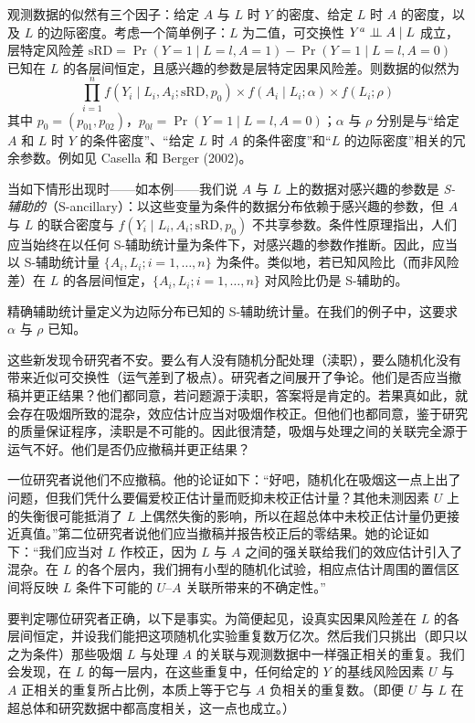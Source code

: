 \begin{techpoint}[条件性原理的形式陈述]
观测数据的似然有三个因子：给定 $A$ 与 $L$ 时 $Y$ 的密度、给定 $L$ 时 $A$ 的密度，以及 $L$ 的边际密度。考虑一个简单例子：$L$ 为二值，可交换性 $Y^a\perp\!\!\!\perp A\mid L$ 成立，层特定风险差 $\mathrm{sRD}=\Pr(Y=1\mid L=l,A=1)-\Pr(Y=1\mid L=l,A=0)$ 已知在 $L$ 的各层间恒定，且感兴趣的参数是层特定因果风险差。则数据的似然为
\[
\prod_{i=1}^{n} f(Y_i\mid L_i,A_i;\mathrm{sRD},p_0)\times f(A_i\mid L_i;\alpha)\times f(L_i;\rho)
\]
其中 $p_0=(p_{01},p_{02})$，$p_{0l}=\Pr(Y=1\mid L=l,A=0)$；$\alpha$ 与 $\rho$ 分别是与“给定 $A$ 和 $L$ 时 $Y$ 的条件密度”、“给定 $L$ 时 $A$ 的条件密度”和“$L$ 的边际密度”相关的冗余参数。例如见 Casella 和 Berger (2002)。

当如下情形出现时——如本例——我们说 $A$ 与 $L$ 上的数据对感兴趣的参数是 \emph{S-辅助的}（S-ancillary）：以这些变量为条件的数据分布依赖于感兴趣的参数，但 $A$ 与 $L$ 的联合密度与 $f(Y_i\mid L_i,A_i;\mathrm{sRD},p_0)$ 不共享参数。条件性原理指出，人们应当始终在以任何 S-辅助统计量为条件下，对感兴趣的参数作推断。因此，应当以 S-辅助统计量 $\{A_i,L_i;i=1,\dots,n\}$ 为条件。类似地，若已知风险比（而非风险差）在 $L$ 的各层间恒定，$\{A_i,L_i;i=1,\dots,n\}$ 对风险比仍是 S-辅助的。

精确辅助统计量定义为边际分布已知的 S-辅助统计量。在我们的例子中，这要求 $\alpha$ 与 $\rho$ 已知。
\end{techpoint}

这些新发现令研究者不安。要么有人没有随机分配处理（渎职），要么随机化没有带来近似可交换性（运气差到了极点）。研究者之间展开了争论。他们是否应当撤稿并更正结果？他们都同意，若问题源于渎职，答案将是肯定的。若果真如此，就会存在吸烟所致的混杂，效应估计应当对吸烟作校正。但他们也都同意，鉴于研究的质量保证程序，渎职是不可能的。因此很清楚，吸烟与处理之间的关联完全源于运气不好。他们是否仍应撤稿并更正结果？

一位研究者说他们不应撤稿。他的论证如下：“好吧，随机化在吸烟这一点上出了问题，但我们凭什么要偏爱校正估计量而贬抑未校正估计量？其他未测因素 $U$ 上的失衡很可能抵消了 $L$ 上偶然失衡的影响，所以在超总体中未校正估计量仍更接近真值。”第二位研究者说他们应当撤稿并报告校正后的零结果。她的论证如下：“我们应当对 $L$ 作校正，因为 $L$ 与 $A$ 之间的强关联给我们的效应估计引入了混杂。在 $L$ 的各个层内，我们拥有小型的随机化试验，相应点估计周围的置信区间将反映 $L$ 条件下可能的 $U$–$A$ 关联所带来的不确定性。”

要判定哪位研究者正确，以下是事实。为简便起见，设真实因果风险差在 $L$ 的各层间恒定，并设我们能把这项随机化实验重复数万亿次。然后我们只挑出（即只以之为条件）那些吸烟 $L$ 与处理 $A$ 的关联与观测数据中一样强正相关的重复。我们会发现，在 $L$ 的每一层内，在这些重复中，任何给定的 $Y$ 的基线风险因素 $U$ 与 $A$ 正相关的重复所占比例，本质上等于它与 $A$ 负相关的重复数。（即便 $U$ 与 $L$ 在超总体和研究数据中都高度相关，这一点也成立。）

